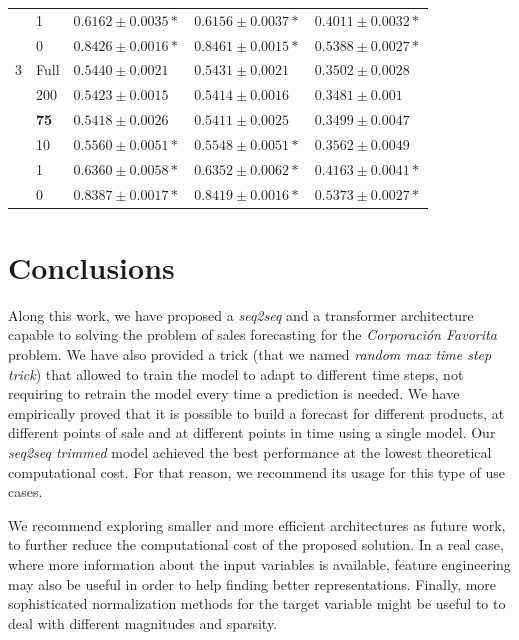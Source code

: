 \begin{table}[h]
\begin{tabular}{lllll}
      & 1               & $ 0.6162 \pm 0.0035 *$          & $ 0.6156 \pm 0.0037 *$         & $ 0.4011 \pm 0.0032 *$          \\
      & 0               & $ 0.8426 \pm 0.0016 *$          & $ 0.8461 \pm 0.0015 *$         & $ 0.5388 \pm 0.0027 *$          \\ \hline
		3      & Full            & $ 0.5440 \pm 0.0021 $           & $ 0.5431 \pm 0.0021 $          & $ 0.3502 \pm 0.0028 $          \\
      & 200             & $ 0.5423 \pm 0.0015 $           & $ 0.5414 \pm 0.0016 $          & $ 0.3481 \pm 0.001 $           \\
      & \textbf{75}     & $ \mathbf{0.5418 \pm 0.0026} $  & $ \mathbf{0.5411 \pm 0.0025} $ & $ \mathbf{0.3499 \pm 0.0047} $ \\
      & 10              & $ 0.5560 \pm 0.0051 *$          & $ 0.5548 \pm 0.0051 *$         & $ 0.3562 \pm 0.0049 $          \\
      & 1               & $ 0.6360 \pm 0.0058 *$          & $ 0.6352 \pm 0.0062 *$         & $ 0.4163 \pm 0.0041 *$          \\
      & 0               & $ 0.8387 \pm 0.0017 *$          & $ 0.8419 \pm 0.0016 *$         & $ 0.5373 \pm 0.0027 *$          \\ \hline
	\end{tabular}
\end{table}

\section{Conclusions} \label{sec:salesforecast_conclusions}

Along this work, we have proposed a \textit{seq2seq} and a transformer architecture capable to solving the problem of sales forecasting for the \textit{Corporación Favorita} problem. We have also provided a trick (that we named \textit{random max time step trick}) that allowed to train the model to adapt to different time steps, not requiring to retrain the model every time a prediction is needed. We have empirically proved that it is possible to build a forecast for different products, at different points of sale and at different points in time using a single model. Our \textit{seq2seq trimmed} model achieved the best performance at the lowest theoretical computational cost. For that reason, we recommend its usage for this type of use cases.

We recommend exploring smaller and more efficient architectures as future work, to further reduce the computational cost of the proposed solution. In a real case, where more information about the input variables is available, feature engineering may also be useful in order to help finding better representations. Finally, more sophisticated normalization methods for the target variable might be useful to to deal with different magnitudes and sparsity.


